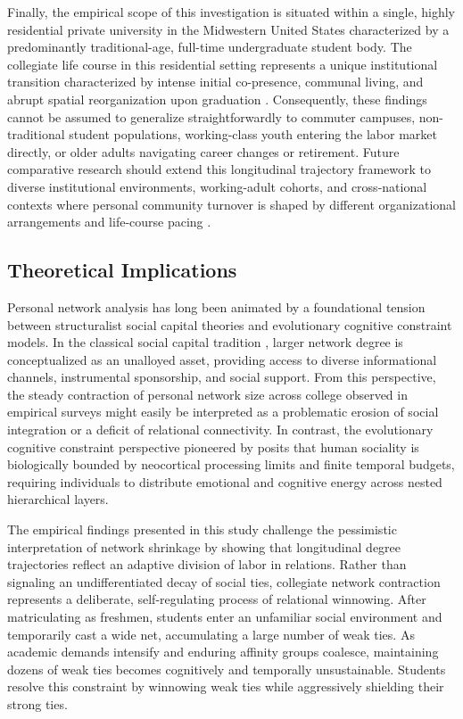 \documentclass[12pt]{article}
\begin{document}
Finally, the empirical scope of this investigation is situated within a single, highly residential private university in the Midwestern United States characterized by a predominantly traditional-age, full-time undergraduate student body. The collegiate life course in this residential setting represents a unique institutional transition characterized by intense initial co-presence, communal living, and abrupt spatial reorganization upon graduation \citep{hurtado1998enhancing}. Consequently, these findings cannot be assumed to generalize straightforwardly to commuter campuses, non-traditional student populations, working-class youth entering the labor market directly, or older adults navigating career changes or retirement. Future comparative research should extend this longitudinal trajectory framework to diverse institutional environments, working-adult cohorts, and cross-national contexts where personal community turnover is shaped by different organizational arrangements and life-course pacing \citep{bidart2018personal, fischer1982dwell}.

\subsection{Theoretical Implications}

Personal network analysis has long been animated by a foundational tension between structuralist social capital theories and evolutionary cognitive constraint models. In the classical social capital tradition \citep{granovetter1973strength, lin2001social, borgatti2009network}, larger network degree is conceptualized as an unalloyed asset, providing access to diverse informational channels, instrumental sponsorship, and social support. From this perspective, the steady contraction of personal network size across college observed in empirical surveys might easily be interpreted as a problematic erosion of social integration or a deficit of relational connectivity. In contrast, the evolutionary cognitive constraint perspective pioneered by \citet{dunbar1992neocortex, dunbar1998social, dunbar2018anatomy} posits that human sociality is biologically bounded by neocortical processing limits and finite temporal budgets, requiring individuals to distribute emotional and cognitive energy across nested hierarchical layers.

The empirical findings presented in this study challenge the pessimistic interpretation of network shrinkage by showing that longitudinal degree trajectories reflect an adaptive division of labor in relations. Rather than signaling an undifferentiated decay of social ties, collegiate network contraction represents a deliberate, self-regulating process of relational winnowing. After matriculating as freshmen, students enter an unfamiliar social environment and temporarily cast a wide net, accumulating a large number of weak ties. As academic demands intensify and enduring affinity groups coalesce, maintaining dozens of weak ties becomes cognitively and temporally unsustainable. Students resolve this constraint by winnowing weak ties while aggressively shielding their strong ties.
\end{document}
